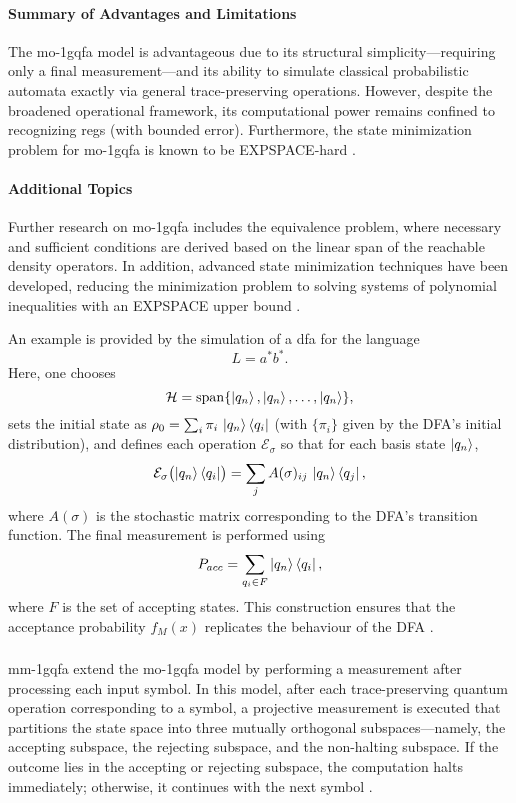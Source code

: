 \paragraph{Summary of Advantages and Limitations}  
The \gls{mo-1gqfa} model is advantageous due to its structural simplicity—requiring only a final measurement—and its ability to simulate classical probabilistic automata exactly via general trace-preserving operations. However, despite the broadened operational framework, its computational power remains confined to recognizing \glspl{reg} (with bounded error). Furthermore, the state minimization problem for \gls{mo-1gqfa} is known to be EXPSPACE-hard \cite{mateus2012complexity}.

\paragraph{Additional Topics}  
Further research on \gls{mo-1gqfa} includes the equivalence problem, where necessary and sufficient conditions are derived based on the linear span of the reachable density operators. In addition, advanced state minimization techniques have been developed, reducing the minimization problem to solving systems of polynomial inequalities with an EXPSPACE upper bound \cite{mercer2008lower}.

\begin{example}  
An example is provided by the simulation of a \gls{dfa} for the language
\[
L=a^*b^*.
\]
Here, one chooses 
\[
\mathcal{H}=\mathrm{span}\{\ket{q_n},\ket{q_n},\dots,\ket{q_n}\},
\]
sets the initial state as $\rho_0=\sum_{i}\pi_i\,\ket{q_n}\bra{q_i}$ (with $\{\pi_i\}$ given by the DFA's initial distribution), and defines each operation $\mathcal{E}_\sigma$ so that for each basis state $\ket{q_n}$,
\[
\mathcal{E}_\sigma\bigl(\ket{q_n}\bra{q_i}\bigr)=\sum_{j}A(\sigma)_{ij}\,\ket{q_n}\bra{q_j},
\]
where $A(\sigma)$ is the stochastic matrix corresponding to the DFA's transition function. The final measurement is performed using 
\[
P_{acc}=\sum_{q_i\in F}\ket{q_n}\bra{q_i},
\]
where $F$ is the set of accepting states. This construction ensures that the acceptance probability $f_M(x)$ replicates the behaviour of the DFA \cite{li2012characterizations}.
\end{example}

\subsubsection{}
\gls{mm-1gqfa} extend the \gls{mo-1gqfa} model by performing a measurement after processing each input symbol. In this model, after each trace-preserving quantum operation corresponding to a symbol, a projective measurement is executed that partitions the state space into three mutually orthogonal subspaces—namely, the accepting subspace, the rejecting subspace, and the non-halting subspace. If the outcome lies in the accepting or rejecting subspace, the computation halts immediately; otherwise, it continues with the next symbol \cite{li2012characterizations}.

